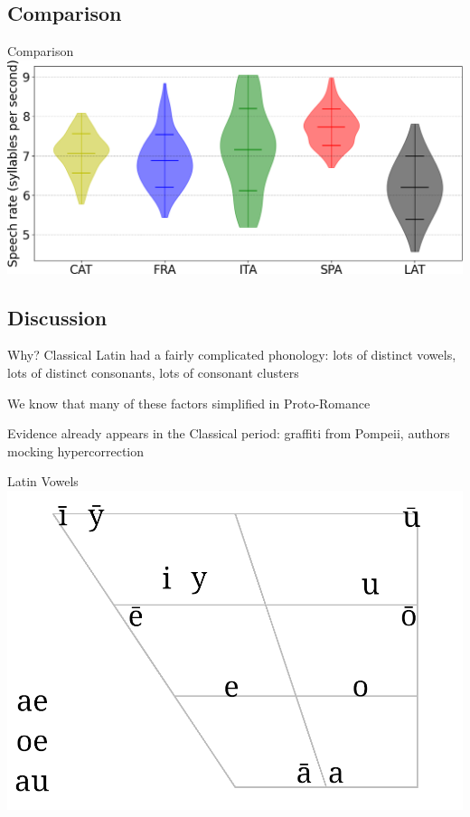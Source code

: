\documentclass{beamer}
\begin{document}
\subsection{Comparison}

\begin{frame}{Comparison}
\includegraphics[width=\linewidth]{violin2}
\end{frame}

\subsection{Discussion}

\begin{frame}{Why?}
Classical Latin had a fairly complicated phonology: lots of distinct vowels, lots of distinct consonants, lots of consonant clusters

We know that many of these factors simplified in Proto-Romance

Evidence already appears in the Classical period: graffiti from Pompeii, authors mocking hypercorrection
\end{frame}

\begin{frame}{Latin Vowels}
\includegraphics[width=\linewidth]{latin_vowels}
\end{frame}
\end{document}
